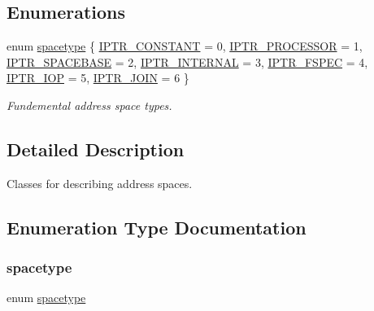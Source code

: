 \subsection*{Enumerations}
\begin{DoxyCompactItemize}
\item 
enum \mbox{\hyperlink{space_8hh_a1a83535cca68b7ca3f25bfad70262231}{spacetype}} \{ \newline
\mbox{\hyperlink{space_8hh_a1a83535cca68b7ca3f25bfad70262231a3ae8eb421cb8d460bc939657402d970a}{I\+P\+T\+R\+\_\+\+C\+O\+N\+S\+T\+A\+NT}} = 0, 
\mbox{\hyperlink{space_8hh_a1a83535cca68b7ca3f25bfad70262231ac6a759a590195b56c099150c63cdd7b2}{I\+P\+T\+R\+\_\+\+P\+R\+O\+C\+E\+S\+S\+OR}} = 1, 
\mbox{\hyperlink{space_8hh_a1a83535cca68b7ca3f25bfad70262231aebea73c9a75ffad2803a312d021932b5}{I\+P\+T\+R\+\_\+\+S\+P\+A\+C\+E\+B\+A\+SE}} = 2, 
\mbox{\hyperlink{space_8hh_a1a83535cca68b7ca3f25bfad70262231a1eef2cfc279c246cc7ea0387d8c0aa66}{I\+P\+T\+R\+\_\+\+I\+N\+T\+E\+R\+N\+AL}} = 3, 
\newline
\mbox{\hyperlink{space_8hh_a1a83535cca68b7ca3f25bfad70262231a01bf4d06e504bf92eabbfd633e5c74c0}{I\+P\+T\+R\+\_\+\+F\+S\+P\+EC}} = 4, 
\mbox{\hyperlink{space_8hh_a1a83535cca68b7ca3f25bfad70262231ad644dc33b71c7d421fcd0fb2003407c7}{I\+P\+T\+R\+\_\+\+I\+OP}} = 5, 
\mbox{\hyperlink{space_8hh_a1a83535cca68b7ca3f25bfad70262231a67805851c12bd1477c2a748e53e45f9c}{I\+P\+T\+R\+\_\+\+J\+O\+IN}} = 6
 \}
\begin{DoxyCompactList}\small\item\em Fundemental address space types. \end{DoxyCompactList}\end{DoxyCompactItemize}


\subsection{Detailed Description}
Classes for describing address spaces. 



\subsection{Enumeration Type Documentation}
\mbox{\label{space_8hh_a1a83535cca68b7ca3f25bfad70262231}} 
\subsubsection{\texorpdfstring{spacetype}{spacetype}}
{\footnotesize\ttfamily enum \mbox{\hyperlink{space_8hh_a1a83535cca68b7ca3f25bfad70262231}{spacetype}}}



